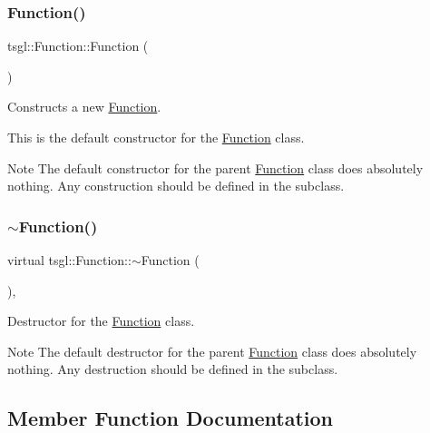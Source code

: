 \subsubsection{\texorpdfstring{Function()}{Function()}}
{\footnotesize\ttfamily tsgl\+::\+Function\+::\+Function (\begin{DoxyParamCaption}{ }\end{DoxyParamCaption})\hspace{0.3cm}{\ttfamily [inline]}}



Constructs a new \hyperlink{classtsgl_1_1_function}{Function}. 

This is the default constructor for the \hyperlink{classtsgl_1_1_function}{Function} class. \begin{DoxyNote}{Note}
The default constructor for the parent \hyperlink{classtsgl_1_1_function}{Function} class does absolutely nothing. Any construction should be defined in the subclass. 
\end{DoxyNote}
\mbox{\label{classtsgl_1_1_function_a3b8cbd26a32c6ae75b12e7397bb42c41}} 
\subsubsection{\texorpdfstring{$\sim$\+Function()}{~Function()}}
{\footnotesize\ttfamily virtual tsgl\+::\+Function\+::$\sim$\+Function (\begin{DoxyParamCaption}{ }\end{DoxyParamCaption})\hspace{0.3cm}{\ttfamily [inline]}, {\ttfamily [virtual]}}



Destructor for the \hyperlink{classtsgl_1_1_function}{Function} class. 

\begin{DoxyNote}{Note}
The default destructor for the parent \hyperlink{classtsgl_1_1_function}{Function} class does absolutely nothing. Any destruction should be defined in the subclass. 
\end{DoxyNote}


\subsection{Member Function Documentation}
\mbox{\label{classtsgl_1_1_function_affb7b3b19a04efefa29a9870d666e912}} 
